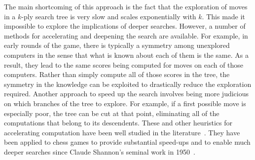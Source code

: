 The main shortcoming of this approach is the fact that the
exploration of moves in a $k$-ply search tree is very slow and scales
exponentially with $k$. This made it impossible to explore the
implications of deeper searches. However, a number of methods
for accelerating and deepening the search are available. For example,
in early rounds of the game, there is typically a symmetry among unexplored
computers in the sense that what is known about each of them is the
same. As a result, they lead to the same scores being computed for
moves on each of those computers. 
Rather
than simply compute all of those scores in the tree, the symmetry in
the knowledge can be exploited to drastically reduce the exploration
required. Another approach to speed up the search involves being
more judicious on which branches of the tree to explore. For example,
if a first possible move is especially poor, the tree can be cut at
that point, eliminating all of the computations that belong to its
descendents. These and other heuristics for accelerating computation
have been well studied in the literature~\cite{levy2009computer}. They
have been applied to chess games to provide substantial speed-ups and
to enable much deeper searches since Claude Shannon's seminal work in
1950~\cite{shannon1950programming}.

